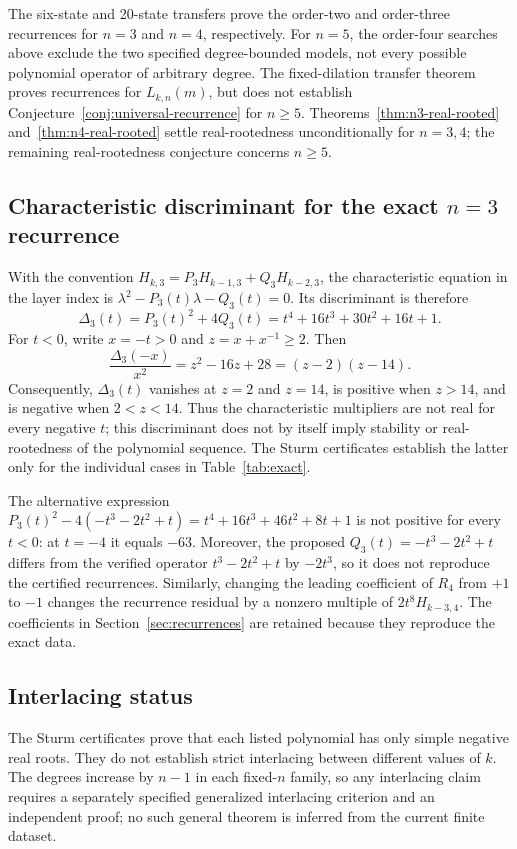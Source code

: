\documentclass[11pt,a4paper]{article}
\theoremstyle{definition}
\begin{document}
The six-state and 20-state transfers prove the order-two and order-three
recurrences for $n=3$ and $n=4$, respectively. For $n=5$, the
order-four searches above exclude
the two specified degree-bounded models, not every possible polynomial
operator of arbitrary degree. The fixed-dilation transfer theorem proves
recurrences for $L_{k,n}(m)$, but does not establish
Conjecture~\ref{conj:universal-recurrence} for $n\ge5$.
Theorems~\ref{thm:n3-real-rooted} and~\ref{thm:n4-real-rooted} settle
real-rootedness unconditionally for $n=3,4$; the remaining
real-rootedness conjecture concerns $n\ge5$.

\subsection[Characteristic discriminant for the exact n=3 recurrence]{Characteristic discriminant for the exact $n=3$ recurrence}

With the convention $H_{k,3}=P_3H_{k-1,3}+Q_3H_{k-2,3}$, the
characteristic equation in the layer index is
$\lambda^2-P_3(t)\lambda-Q_3(t)=0$. Its discriminant is therefore
\[
\Delta_3(t)=P_3(t)^2+4Q_3(t)
=t^4+16t^3+30t^2+16t+1.
\]
For $t<0$, write $x=-t>0$ and $z=x+x^{-1}\ge2$. Then
\[
\frac{\Delta_3(-x)}{x^2}=z^2-16z+28=(z-2)(z-14).
\]
Consequently, $\Delta_3(t)$ vanishes at $z=2$ and $z=14$, is positive
when $z>14$, and is negative when $2<z<14$. Thus the characteristic
multipliers are not real for every negative $t$; this discriminant does
not by itself imply stability or real-rootedness of the polynomial
sequence. The Sturm certificates establish the latter only for the
individual cases in Table~\ref{tab:exact}.

The alternative expression
$P_3(t)^2-4(-t^3-2t^2+t)=t^4+16t^3+46t^2+8t+1$
is not positive for every $t<0$: at $t=-4$ it equals $-63$. Moreover,
the proposed $Q_3(t)=-t^3-2t^2+t$ differs from the verified operator
$t^3-2t^2+t$ by $-2t^3$, so it does not reproduce the certified
recurrences. Similarly, changing the leading coefficient of $R_4$ from
$+1$ to $-1$ changes the recurrence residual by a nonzero multiple of
$2t^8H_{k-3,4}$. The coefficients in Section~\ref{sec:recurrences} are
retained because they reproduce the exact data.

\subsection{Interlacing status}

The Sturm certificates prove that each listed polynomial has only simple
negative real roots. They do not establish strict interlacing between
different values of $k$. The degrees increase by $n-1$ in each fixed-$n$
family, so any interlacing claim requires a separately specified
generalized interlacing criterion and an independent proof; no such
general theorem is inferred from the current finite dataset.
\end{document}
